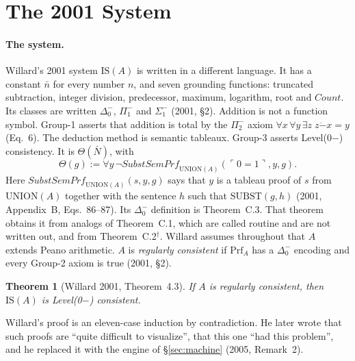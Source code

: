 \documentclass[11pt]{article}
\newcommand{\Prf}{\mathrm{Prf}}
\newcommand{\Subst}{\mathrm{SUBST}}
\newcommand{\gn}[1]{\ulcorner #1\urcorner}  %
\newcommand{\sk}{\ensuremath{^\dagger}}    %
\theoremstyle{plain}
\newtheorem{theorem}{Theorem}
\theoremstyle{definition}
\begin{document}
\section{The 2001 System}
\label{app:2001}

\paragraph{The system.} Willard's 2001 system $\mathrm{IS}(A)$ is written in a
different language. It has a constant $\bar n$ for every number $n$, and seven
grounding functions: truncated subtraction, integer division, predecessor,
maximum, logarithm, root and $\mathit{Count}$. Its classes are written
$\Delta_0^-$, $\Pi_1^-$ and $\Sigma_1^-$ (2001, \S2). Addition is not a
function symbol. Group-1 asserts that addition is total by the $\Pi_2^-$ axiom
$\forall x\,\forall y\,\exists z\; z \mathbin{\dot-} x = y$ (Eq.~6). The
deduction method is semantic tableaux. Group-3 asserts Level(0$-$)
consistency. It is $\Theta(\bar N)$, with
\[
\Theta(g) := \forall y\,\neg\mathit{SubstSemPrf}_{\mathrm{UNION}(A)}(\gn{0=1},
y, g).
\]
Here $\mathit{SubstSemPrf}_{\mathrm{UNION}(A)}(s,y,g)$ says that $y$ is a
tableau proof of $s$ from $\mathrm{UNION}(A)$ together with the sentence $h$
such that $\Subst(g,h)$ (2001, Appendix~B, Eqs.~86--87). Its $\Delta_0^-$
definition is Theorem~C.3. That theorem obtains it from analogs of
Theorem~C.1, which are called routine and are not written out, and from
Theorem~C.2\sk. Willard assumes throughout that $A$ extends Peano arithmetic.
$A$ is \emph{regularly consistent} if $\Prf_A$ has a $\Delta_0^-$ encoding and
every Group-2 axiom is true (2001, \S2).

\begin{theorem}[Willard 2001, Theorem~4.3]\label{thm:is}
If $A$ is regularly consistent, then $\mathrm{IS}(A)$ is Level(0$-$)
consistent.
\end{theorem}

\noindent
Willard's proof is an eleven-case induction by contradiction. He later wrote
that such proofs are ``quite difficult to visualize'', that this one ``had
this problem'', and he replaced it with the engine of \S\ref{sec:machine}
(2005, Remark~2).
\end{document}
